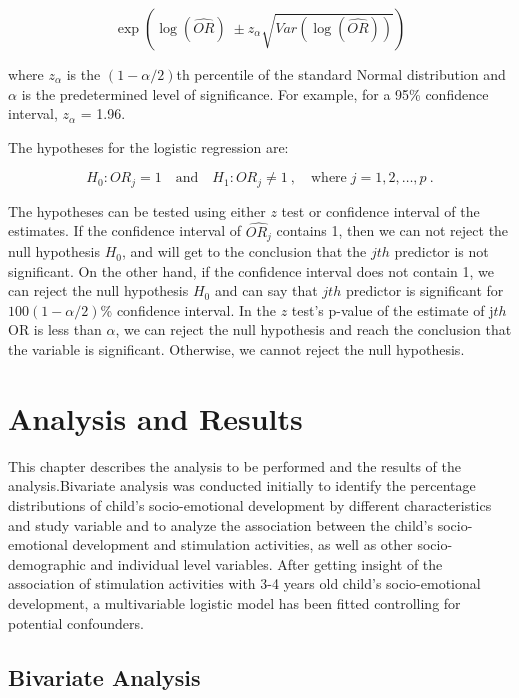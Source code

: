 \documentclass[
  12pt,
  oneside]{report}
\begin{document}
\[
\exp\left(\log(\widehat{OR}) \; \pm z_\alpha \sqrt{Var(\log(\widehat{OR}))}\right)
\]

where \(z_\alpha\) is the \((1 − \alpha/2)\)th percentile of the standard Normal distribution and \(\alpha\) is the predetermined level of significance. For example, for a 95\% confidence interval, \(z_\alpha\) = 1.96.

The hypotheses for the logistic regression are:

\[
H_0 : OR_j = 1 \quad \text{and} \quad H_1 : OR_j \ne 1 \:,  \quad \text{where} \; j = 1, 2, \dots, p \: .  
\]

The hypotheses can be tested using either \(z\) test or confidence interval of the
estimates. If the confidence interval of \(\widehat{OR_j}\) contains 1, then we can not reject the null hypothesis \(H_0\), and will get to the conclusion that the \(jth\) predictor is not significant. On the other hand, if the confidence interval does not contain 1, we can reject the null hypothesis \(H_0\) and can say that \(jth\) predictor is significant for \(100(1 − \alpha/2)\)\% confidence interval. In the \(z\) test's p-value of the estimate of j\(th\) OR is less than \(\alpha\), we can reject the null hypothesis and reach the conclusion that the variable is significant. Otherwise, we cannot reject the null hypothesis.

\newpage

\hypertarget{analysis-and-results}{%
\chapter{Analysis and Results}\label{analysis-and-results}}

This chapter describes the analysis to be performed and the results of the analysis.Bivariate analysis was conducted initially to identify the percentage distributions of child's socio-emotional development by different characteristics and study variable and to analyze the association between the child's socio-emotional development and stimulation activities, as well as other socio-demographic and individual level variables. After getting insight of the association of stimulation activities with 3-4 years old child's socio-emotional development, a multivariable logistic model has been fitted controlling for potential confounders.

\hypertarget{bivariate-analysis-1}{%
\section{Bivariate Analysis}\label{bivariate-analysis-1}}
\end{document}
